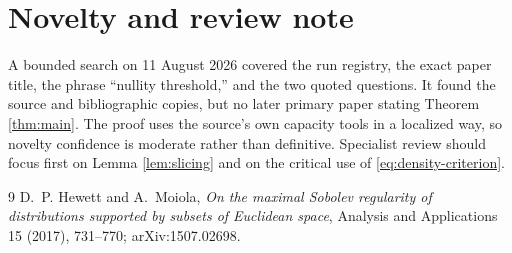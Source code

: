\documentclass[11pt]{article}
\begin{document}
\section{Novelty and review note}

A bounded search on 11 August 2026 covered the run registry, the exact paper
title, the phrase ``nullity threshold,'' and the two quoted questions.  It
found the source and bibliographic copies, but no later primary paper stating
Theorem \ref{thm:main}.  The proof uses the source's own capacity tools in a
localized way, so novelty confidence is moderate rather than definitive.
Specialist review should focus first on Lemma \ref{lem:slicing} and on the
critical use of \eqref{eq:density-criterion}.

\begin{thebibliography}{9}
D.~P. Hewett and A.~Moiola,
\emph{On the maximal Sobolev regularity of distributions supported by subsets
of Euclidean space}, Analysis and Applications 15 (2017), 731--770;
arXiv:1507.02698.
\end{thebibliography}
\end{document}

